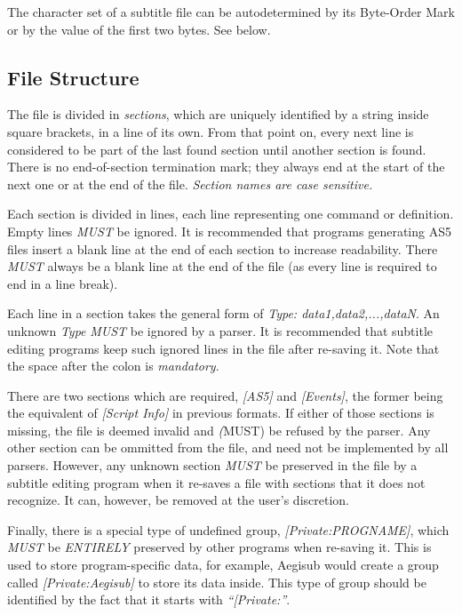 \documentclass{spec}
\begin{document}
The character set of a subtitle file can be autodetermined by its Byte-Order Mark or by
the value of the first two bytes. See below.

\subsection{File Structure}
The file is divided in \emph{sections}, which are uniquely identified by a string inside
square brackets, in a line of its own. From that point on, every next line is considered
to be part of the last found section until another section is found. There is no end-of-section
termination mark; they always end at the start of the next one or at the end of the file.
\emph{Section names are case sensitive.}

Each section is divided in lines, each line representing one command or definition. Empty
lines \emph{MUST} be ignored. It is recommended that programs generating AS5 files insert
a blank line at the end of each section to increase readability. There \emph{MUST} always
be a blank line at the end of the file (as every line is required to end in a line break).

Each line in a section takes the general form of \textit{Type: data1,data2,...,dataN}. An
unknown \textit{Type} \emph{MUST} be ignored by a parser. It is recommended that subtitle
editing programs keep such ignored lines in the file after re-saving it. Note that the space
after the colon is \emph{mandatory}.

There are two sections which are required, \emph{[AS5]} and \emph{[Events]}, the former being
the equivalent of \emph{[Script Info]} in previous formats. If either of those sections is
missing, the file is deemed invalid and \emph(MUST) be refused by the parser. Any other section
can be ommitted from the file, and need not be implemented by all parsers. However, any unknown
section \emph{MUST} be preserved in the file by a subtitle editing program when it re-saves a
file with sections that it does not recognize. It can, however, be removed at the user's discretion.

Finally, there is a special type of undefined group, \emph{[Private:PROGNAME]}, which 
\emph{MUST} be \emph{ENTIRELY} preserved by other programs when re-saving it. This is used to
store program-specific data, for example, Aegisub would create a group called
\emph{[Private:Aegisub]} to store its data inside. This type of group should be identified
by the fact that it starts with \emph{"`[Private:"'}.
\end{document}
